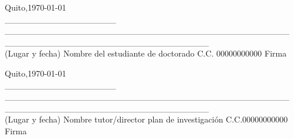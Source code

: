 \documentclass[a4paper,12pt]{article}
\begin{document}
\vspace{1cm}

\begin{flushleft}
	Quito,\today\\
	\_\_\_\_\_\_\_\_\_\_\_\_\_\_\_\_\_\_\hspace{0.1cm} \_\_\_\_\_\_\_\_\_\_\_\_\_\_\_\_\_\_\_\_\_\_\_\_\_\_\_\_\_\_\_\_\_\_\_\_\_\_\_\_\_\_\_\_\_\_  \hspace{0.3cm}\_\_\_\_\_\_\_\_\_\_\_\_\_\_\_\_\_\hspace{0.1cm}\_\_\_\_\_\_\_\_\_\_\_\_\_\_\_\_\\
	(Lugar y fecha) \hspace{0.2cm} Nombre del estudiante de doctorado \hspace{0.2cm} C.C.\hspace{0.05cm} 00000000000 \hspace{0.1cm} Firma \\
\end{flushleft}

\vspace{1cm}

\begin{flushleft}
	Quito,\today\\
	\_\_\_\_\_\_\_\_\_\_\_\_\_\_\_\_\_\_\hspace{0.1cm} \_\_\_\_\_\_\_\_\_\_\_\_\_\_\_\_\_\_\_\_\_\_\_\_\_\_\_\_\_\_\_\_\_\_\_\_\_\_\_\_\_\_\_\_\_\_  \hspace{0.3cm}\_\_\_\_\_\_\_\_\_\_\_\_\_\_\_\_\_\hspace{0.1cm}\_\_\_\_\_\_\_\_\_\_\_\_\_\_\_\_\\
	(Lugar y fecha) \hspace{0.0cm} Nombre tutor/director plan de investigación \hspace{0.1cm} C.C.\hspace{0.05cm}00000000000 \hspace{0.1cm} Firma \\
\end{flushleft}

\vspace{1cm}
\end{document}
